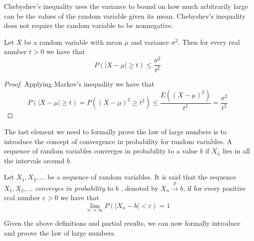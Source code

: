 Chebyshev's inequality uses the variance to bound on how much arbitrarily large can be the values of the random variable given its mean. Chebyshev's inequality does not require the random variable to be nonnegative.

\begin{corollary}
 Let $X$ be a random variable with mean $\mu$ and variance $\sigma^2$. Then for every real number $t > 0$ we have that
\[
P \left( \left| X - \mu \right| \geq t \right) \leq \frac{\sigma^2}{t^2}
\]
\end{corollary}
\begin{proof}
Applying Markov's inequality we have that
\[
P \left( \left| X - \mu \right| \geq t \right) = P \left( \left( X - \mu \right)^2 \geq t^2 \right) \leq \frac{E \left( \left( X - \mu \right)^2 \right)}{t^2} = \frac{\sigma^2}{t^2}
\]
\end{proof}

The last element we need to formally prove the law of large numbers is to introduce the concept of convergence in probability for random variables. A sequence of random variables converges in probability to a value $b$ if $X_n$ lies in all the intervals around $b$.

\begin{definition}
Let $X_{1}, X_{2}, \ldots$ be a sequence  of random variables. It is said that the sequence $X_{1}, X_{2}, \ldots$ \emph{converges in probability} to $b$ , denoted by $X_{n} \overset{p}{\rightarrow}b$, if for every positive real number $\varepsilon>0$ we have that
\[
\lim_{n \rightarrow \infty} P \left( \left| X_{n} - b \right| < \varepsilon \right) = 1
\]
\end{definition}

Given the above definitions and partial results, we can now formally introduce and proove the law of large numbers.

